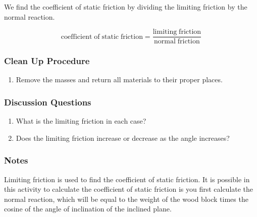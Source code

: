 We find the coefficient of static friction by dividing the limiting friction by the normal reaction.

\begin{center}
$$ \mathrm{coefficient\;of\;static\;friction} = \frac{\mathrm{limiting\;friction}}{\mathrm{normal \;friction}} $$
\end{center}

\subsubsection*{Clean Up Procedure}
\begin{enumerate}
\item{Remove the masses and return all materials to their proper places.} 
\end{enumerate}

\subsubsection*{Discussion Questions}
\begin{enumerate}
\item{What is the limiting friction in each case?}
\item{Does the limiting friction increase or decrease as the angle increases?}
\end{enumerate}

\subsubsection*{Notes}
Limiting friction is used to find the coefficient of static friction. It is possible in this activity to calculate the coefficient of static friction is you first calculate the normal reaction, which will be equal to the weight of the wood block times the cosine of the angle of inclination of the inclined plane.
